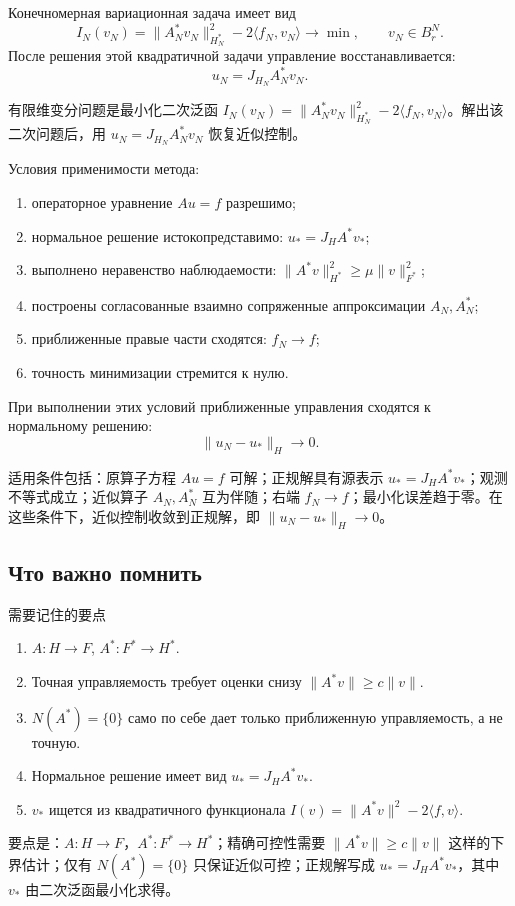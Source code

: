 \documentclass[12pt,a4paper]{article}
\newcommand{\zh}[1]{\par\noindent #1\par}
\begin{document}
Конечномерная вариационная задача имеет вид
\[
 I_N(v_N)=\|A_N^*v_N\|_{H_N^*}^2-2\langle f_N,v_N\rangle
 \to\min,
 \qquad v_N\in B_r^N.
\]
После решения этой квадратичной задачи управление восстанавливается:
\[
 u_N=J_{H_N}A_N^*v_N.
\]
\zh{有限维变分问题是最小化二次泛函 \(I_N(v_N)=\|A_N^*v_N\|_{H_N^*}^2-2\langle f_N,v_N\rangle\)。解出该二次问题后，用 \(u_N=J_{H_N}A_N^*v_N\) 恢复近似控制。}

Условия применимости метода:
\begin{enumerate}
\item операторное уравнение $Au=f$ разрешимо;
\item нормальное решение истокопредставимо: $u_*=J_HA^*v_*$;
\item выполнено неравенство наблюдаемости: $\|A^*v\|_{H^*}^2\ge \mu\|v\|_{F^*}^2$;
\item построены согласованные взаимно сопряженные аппроксимации $A_N,A_N^*$;
\item приближенные правые части сходятся: $f_N\to f$;
\item точность минимизации стремится к нулю.
\end{enumerate}
При выполнении этих условий приближенные управления сходятся к нормальному решению:
\[
 \|u_N-u_*\|_H\to0.
\]
\zh{适用条件包括：原算子方程 \(Au=f\) 可解；正规解具有源表示 \(u_*=J_HA^*v_*\)；观测不等式成立；近似算子 \(A_N,A_N^*\) 互为伴随；右端 \(f_N\to f\)；最小化误差趋于零。在这些条件下，近似控制收敛到正规解，即 \(\|u_N-u_*\|_H\to0\)。}

\subsection*{Что важно помнить}
\zh{需要记住的要点}
\begin{enumerate}
\item $A:H\to F$, $A^*:F^*\to H^*$.
\item Точная управляемость требует оценки снизу $\|A^*v\|\ge c\|v\|$.
\item $N(A^*)=\{0\}$ само по себе дает только приближенную управляемость, а не точную.
\item Нормальное решение имеет вид $u_*=J_HA^*v_*$.
\item $v_*$ ищется из квадратичного функционала $I(v)=\|A^*v\|^2-2\langle f,v\rangle$.
\end{enumerate}
\zh{要点是：\(A:H\to F\)，\(A^*:F^*\to H^*\)；精确可控性需要 \(\|A^*v\|\ge c\|v\|\) 这样的下界估计；仅有 \(N(A^*)=\{0\}\) 只保证近似可控；正规解写成 \(u_*=J_HA^*v_*\)，其中 \(v_*\) 由二次泛函最小化求得。}
\end{document}
